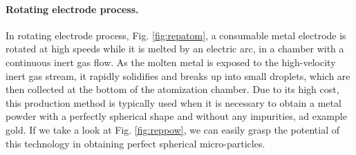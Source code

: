 \paragraph{Rotating electrode process.} In rotating electrode process, Fig. \ref{fig:repatom}, a consumable metal electrode is rotated at high speeds while it is melted by an electric arc, in a chamber with a continuous inert gas flow. As the molten metal is exposed to the high-velocity inert gas stream, it rapidly solidifies and breaks up into small droplets, which are then collected at the bottom of the atomization chamber. Due to its high cost, this production method is typically used when it is necessary to obtain a metal powder with a perfectly spherical shape and without any impurities, ad example gold. If we take a look at Fig. \ref{fig:reppow}, we can easily grasp the potential of this technology in obtaining perfect spherical micro-particles.
